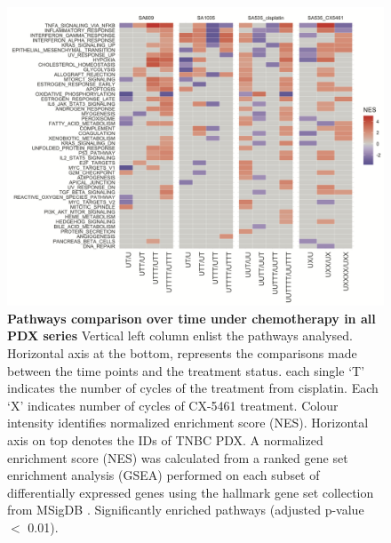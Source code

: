  \begin{figure}
\centering
\includegraphics[width=\textwidth]{Figures/chap5/pathwaysevolution.png}
\caption[Summary of number of genes \textit{in-cis} and \textit{in-trans}]
	{\small
	\textbf{Pathways comparison over time under chemotherapy in all PDX series}
	Vertical left column enlist the pathways analysed. Horizontal axis at the bottom, represents the comparisons made between the time points and the treatment status. each single `T' indicates the number of cycles of the treatment from cisplatin. Each `X' indicates number of cycles of CX-5461 treatment. Colour intensity identifies normalized enrichment score (NES). Horizontal axis on top denotes the IDs of TNBC PDX. A normalized enrichment score (NES) was calculated from a ranked gene set enrichment analysis (GSEA) \cite{shi2007gene} performed on each subset of differentially expressed genes using the hallmark gene set collection from MSigDB \cite{liberzon2015molecular}.  Significantly enriched pathways (adjusted p-value $<$ 0.01).
}
    \label{fig:pathwaysevolution}
    \end{figure}
